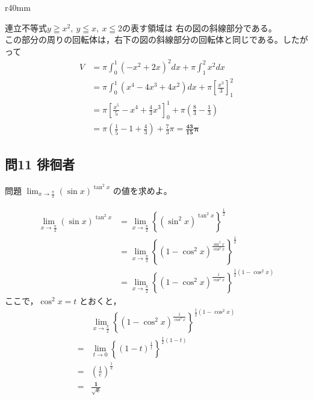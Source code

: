 \documentclass[a5paper]{ltjsarticle}
\begin{document}
\begin{wrapfigure}{r}{40mm}
  \vspace{-70mm}
\end{wrapfigure}
連立不等式$y\geqq x^2,\: y\leqq x,\: x\leqq 2$の表す領域は
右の図の斜線部分である。\\
この部分の周りの回転体は，右下の図の斜線部分の回転体と同じである。したがって
\begin{align*}
  V&=\pi \int_0^1 {(-x^2+2x)}^2dx+\pi \int_1^2 x^2 dx\\
  &=\pi \int_0^1 (x^4-4x^3+4x^2)dx+\pi {\left[\frac{x^3}{3}\right]}_1^2\\
  &=\pi {\left[\frac{x^5}{5}-x^4+\frac{4}{3}x^3\right]}_0^1+\pi \left(\frac{8}{3}-\frac{1}{3}\right)\\
  &=\pi \left(\frac{1}{5}-1+\frac{4}{3}\right)+\frac{7}{3}\pi=\bm{\frac{43}{15}\pi}
\end{align*}
\vspace{20mm}


\subsection*{問11 徘徊者}
\begin{itembox}[l]{問題}
  \( \displaystyle \lim_{x\to \frac{\pi}{2}} \left( \sin x\right)^{\tan^2 x}\) の値を求めよ。
\end{itembox}
\begin{align*}
  \lim_{x\to \frac{\pi}{2}} \left( \sin x\right)^{\tan^2 x}
  &=\lim_{x\to \frac{\pi}{2}} {\left\{{(\sin^2 x)}^{\tan^2 x}\right\}}^{\frac{1}{2}}\\
  &=\lim_{x\to \frac{\pi}{2}} {\left\{ {(1-\cos^2 x)}^{\frac{\sin^2 x}{\cos^2 x}} \right\}}^{\frac{1}{2}}\\
  &=\lim_{x\to \frac{\pi}{2}} {\left\{ {(1-\cos^2 x)}^{\frac{1}{\cos^2 x}} \right\}}^{\frac{1}{2}(1-\cos^2 x)}
\end{align*}
ここで，\( \cos^2 x=t\) とおくと，
\begin{align*}
  &\lim_{x\to \frac{\pi}{2}} {\left\{ {(1-\cos^2 x)}^{\frac{1}{\cos^2 x}} \right\}}^{\frac{1}{2}(1-\cos^2 x)}\\
  =&\lim_{t\to 0}{\left\{ {(1-t)}^{\frac{1}{t}} \right\}}^{\frac{1}{2}(1-t)}\\
  =&{\left( \frac{1}{e}\right)}^{\frac{1}{2}}\\
  =&\bm{\frac{1}{\sqrt{e}}}
\end{align*}
\end{document}
